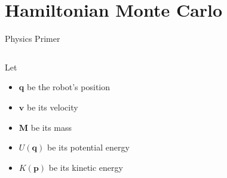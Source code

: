 \documentclass{beamer}
\renewcommand{\vec}[1]{\ensuremath{\boldsymbol{\mathbf{#1}}}}
\newcommand{\mat}[1]{\ensuremath{\boldsymbol{\mathbf{#1}}}}
\begin{document}
\section{Hamiltonian Monte Carlo}

\begin{frame}{Physics Primer}
	\begin{columns}
		\begin{column}{.5\textwidth}
			\begin{definition}
				Let \small
				\begin{itemize}
					\item $\vec{q}$ be the robot's position
					\item $\vec{v}$ be its velocity
					\item $\mat{M}$ be its mass
					\item $U\left(\vec{q}\right)$ be its potential energy
					\item $K\left(\vec{p}\right)$ be its kinetic energy
				\end{itemize}


\end{definition}
\end{column}
\end{columns}
\end{frame}
\end{document}
